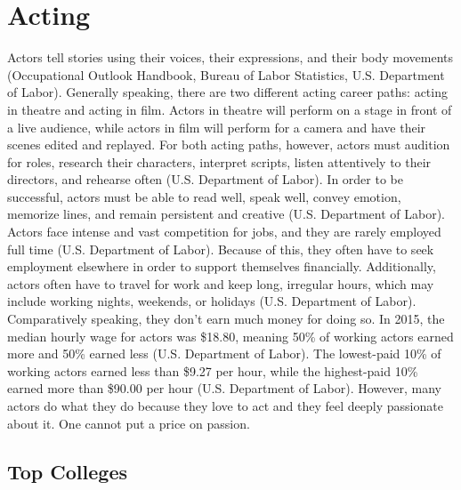 \chapter{Acting}
\begin{multicols}{2}

Actors tell stories using their voices, their expressions, and their body movements (Occupational Outlook Handbook, Bureau of Labor Statistics, U.S. Department of Labor). Generally speaking, there are two different acting career paths: acting in theatre and acting in film. Actors in theatre will perform on a stage in front of a live audience, while actors in film will perform for a camera and have their scenes edited and replayed. For both acting paths, however, actors must audition for roles, research their characters, interpret scripts, listen attentively to their directors, and rehearse often (U.S. Department of Labor). In order to be successful, actors must be able to read well, speak well, convey emotion, memorize lines, and remain persistent and creative (U.S. Department of Labor). Actors face intense and vast competition for jobs, and they are rarely employed full time (U.S. Department of Labor). Because of this, they often have to seek employment elsewhere in order to support themselves financially. Additionally, actors often have to travel for work and keep long, irregular hours, which may include working nights, weekends, or holidays (U.S. Department of Labor). Comparatively speaking, they don’t earn much money for doing so. In 2015, the median hourly wage for actors was \$18.80, meaning 50\% of working actors earned more and 50\% earned less (U.S. Department of Labor). The lowest-paid 10\% of working actors earned less than \$9.27 per hour, while the highest-paid 10\% earned more than \$90.00 per hour (U.S. Department of Labor). However, many actors do what they do because they love to act and they feel deeply passionate about it. One cannot put a price on passion. 
\end{multicols}

\section{Top Colleges}

